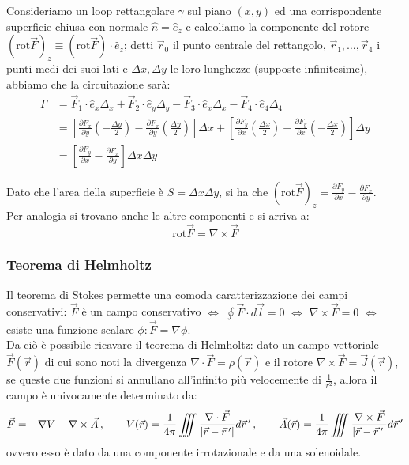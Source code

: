 \documentclass[]{article}
\begin{document}
Consideriamo un loop rettangolare $ \gamma $ sul piano $ \left(x,y\right) $ ed una corrispondente superficie chiusa con normale $ \hat{n} = \hat{e}_z $ e calcoliamo la componente del rotore $ ( \text{rot}\vec{F} )_z \equiv (\text{rot}\vec{F}) \cdot \hat{e}_z $; detti $ \vec{r}_0 $ il punto centrale del rettangolo, $ \vec{r}_1, \dots, \vec{r}_4 $ i punti medi dei suoi lati e $ \Delta x, \Delta y $ le loro lunghezze (supposte infinitesime), abbiamo che la circuitazione sarà:
\begin{equation}
\begin{split}
	\Gamma &= \vec{F}_1 \cdot \hat{e}_x \Delta_x + \vec{F}_2 \cdot \hat{e}_y \Delta_y - \vec{F}_3 \cdot \hat{e}_x \Delta_x - \vec{F}_4 \cdot \hat{e}_4 \Delta_4 \\
	       &= \left[ \frac{\partial F_x}{\partial y} \left( - \frac{\Delta y}{2} \right) - \frac{\partial F_x}{\partial y} \left( \frac{\Delta y}{2} \right) \right] \Delta x + \left[ \frac{\partial F_y}{\partial x} \left( \frac{\Delta x}{2} \right) - \frac{\partial F_y}{\partial x} \left( - \frac{\Delta x}{2} \right)  \right] \Delta y \\
	       &= \left[ \frac{\partial F_y}{\partial x} - \frac{\partial F_x}{\partial y} \right] \Delta x \Delta y
\end{split}
	\label{eq:}
\end{equation}

Dato che l'area della superficie è $ S = \Delta x \Delta y $, si ha che $ (\text{rot} \vec{F})_z = \frac{\partial F_y}{\partial x} - \frac{\partial F_x}{\partial y} $.\\
%
Per analogia si trovano anche le altre componenti e si arriva a:
\begin{equation}
	\text{rot} \vec{F} = \nabla \times \vec{F}
	\label{eq:rotore}
\end{equation}

\subsubsection{Teorema di Helmholtz}

Il teorema di Stokes permette una comoda caratterizzazione dei campi conservativi: $ \vec{F} $ è un campo conservativo $ \iff $ $ \oint \vec{F} \cdot d\vec{l} = 0 $ $ \iff $ $ \nabla\times \vec{F} = 0 $ $ \iff $ esiste una funzione scalare $ \phi : \vec{F} = \nabla\phi $. \\
%
Da ciò è possibile ricavare il teorema di Helmholtz: dato un campo vettoriale $ \vec{F}(\vec{r}) $ di cui sono noti la divergenza $ \nabla\cdot \vec{F} = \rho(\vec{r}) $ e il rotore $ \nabla\times \vec{F} = \vec{J}(\vec{r}) $, se queste due funzioni si annullano all'infinito più velocemente di $ \frac{1}{r^2} $, allora il campo è univocamente determinato da:
\begin{equation}
	\vec{F} = - \nabla V + \nabla\times \vec{A} \, , \qquad V(\vec{r}) = \frac{1}{4\pi} \iiint \displaystyle\frac{\nabla\cdot \vec{F}}{\left\lvert\vec{r} - \vec{r}\,'\right\rvert} d\vec{r}\,' \, , \qquad \vec{A}(\vec{r}) = \frac{1}{4\pi} \iiint \displaystyle\frac{\nabla\times \vec{F}}{\left\lvert\vec{r} - \vec{r}\,'\right\rvert} d\vec{r}\,'
	\label{eq:th-helmholtz}
\end{equation}
ovvero esso è dato da una componente irrotazionale e da una solenoidale.
\end{document}
